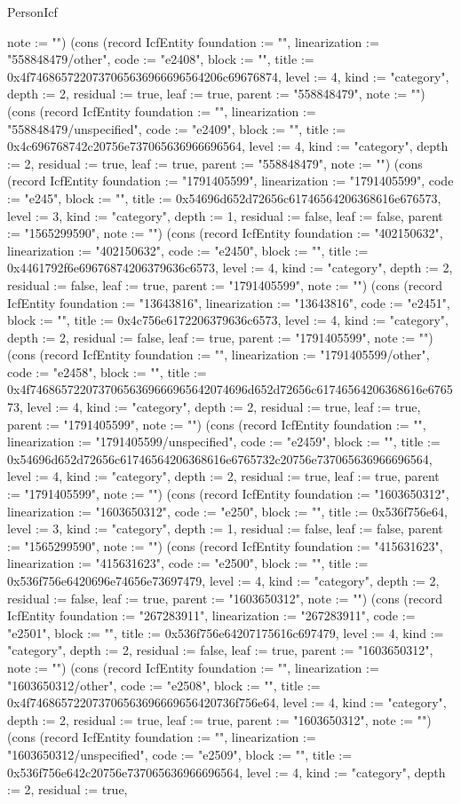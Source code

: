 \begin{lexlean}{PersonIcf}
\begin{semanticmodule}
{note := ""}) (cons (record IcfEntity {foundation := "", linearization := "558848479/other", code := "e2408", block := "", title := 0x4f7468657220737065636966696564206c69676874, level := 4, kind := "category", depth := 2, residual := true, leaf := true, parent := "558848479", note := ""}) (cons (record IcfEntity {foundation := "", linearization := "558848479/unspecified", code := "e2409", block := "", title := 0x4c696768742c20756e737065636966696564, level := 4, kind := "category", depth := 2, residual := true, leaf := true, parent := "558848479", note := ""}) (cons (record IcfEntity {foundation := "1791405599", linearization := "1791405599", code := "e245", block := "", title := 0x54696d652d72656c61746564206368616e676573, level := 3, kind := "category", depth := 1, residual := false, leaf := false, parent := "1565299590", note := ""}) (cons (record IcfEntity {foundation := "402150632", linearization := "402150632", code := "e2450", block := "", title := 0x4461792f6e69676874206379636c6573, level := 4, kind := "category", depth := 2, residual := false, leaf := true, parent := "1791405599", note := ""}) (cons (record IcfEntity {foundation := "13643816", linearization := "13643816", code := "e2451", block := "", title := 0x4c756e6172206379636c6573, level := 4, kind := "category", depth := 2, residual := false, leaf := true, parent := "1791405599", note := ""}) (cons (record IcfEntity {foundation := "", linearization := "1791405599/other", code := "e2458", block := "", title := 0x4f74686572207370656369666965642074696d652d72656c61746564206368616e676573, level := 4, kind := "category", depth := 2, residual := true, leaf := true, parent := "1791405599", note := ""}) (cons (record IcfEntity {foundation := "", linearization := "1791405599/unspecified", code := "e2459", block := "", title := 0x54696d652d72656c61746564206368616e6765732c20756e737065636966696564, level := 4, kind := "category", depth := 2, residual := true, leaf := true, parent := "1791405599", note := ""}) (cons (record IcfEntity {foundation := "1603650312", linearization := "1603650312", code := "e250", block := "", title := 0x536f756e64, level := 3, kind := "category", depth := 1, residual := false, leaf := false, parent := "1565299590", note := ""}) (cons (record IcfEntity {foundation := "415631623", linearization := "415631623", code := "e2500", block := "", title := 0x536f756e6420696e74656e73697479, level := 4, kind := "category", depth := 2, residual := false, leaf := true, parent := "1603650312", note := ""}) (cons (record IcfEntity {foundation := "267283911", linearization := "267283911", code := "e2501", block := "", title := 0x536f756e64207175616c697479, level := 4, kind := "category", depth := 2, residual := false, leaf := true, parent := "1603650312", note := ""}) (cons (record IcfEntity {foundation := "", linearization := "1603650312/other", code := "e2508", block := "", title := 0x4f746865722073706563696669656420736f756e64, level := 4, kind := "category", depth := 2, residual := true, leaf := true, parent := "1603650312", note := ""}) (cons (record IcfEntity {foundation := "", linearization := "1603650312/unspecified", code := "e2509", block := "", title := 0x536f756e642c20756e737065636966696564, level := 4, kind := "category", depth := 2, residual := true, }
\end{semanticmodule}
\end{lexlean}
